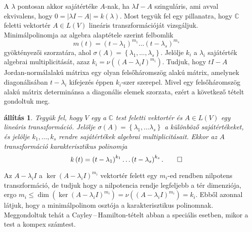 \documentclass[a4paper, showtrims]{memoir}
\makeatletter
\renewenvironment{proof}[1][\proofname]
    {\par\pushQED{\qed}%
    \normalfont \topsep6\p@\@plus6\p@\relax
    \trivlist
    \item[\hskip\labelsep
        \itshape
    #1\@addpunct{:}]\ignorespaces}
    {\popQED\endtrivlist\@endpefalse}
\theoremstyle{plain}
\newtheorem{proposition}{állítás}[chapter]
\theoremstyle{remark}
\theoremstyle{definition}
\makeatother
\begin{document}
\begin{proof}
	A $\lambda$ pontosan akkor sajátértéke $A$-nak,
	ha $\lambda I-A$ szinguláris,
	ami avval ekvivalens, hogy $0=|\lambda I-A|=k\left( \lambda \right)$.
\end{proof}
Most tegyük fel egy pillanatra, hogy $\mathbb{C}$ feletti vektortér $A\in L(V)$ lineáris transzformációját
vizsgáljuk. Minimálpolinomja az algebra alaptétele szerint felbomlik
\[
	m\left( t \right)
	=\left( t-\lambda_1 \right)^{m_1}\dots\left( t-\lambda_s \right)^{m_s}
\]
gyöktényezői szorzatára, ahol $\sigma\left( A \right)=\left\{ \lambda_1,\ldots,\lambda_s\right\}$.
Jelölje $k_i$ a $\lambda_i$ sajátérték algebrai multiplicitását,
azaz $k_i=\nu\left( \left( A-\lambda_i I \right)^{m_i} \right)$.
Tudjuk, hogy $tI-A$ Jordan-normálalakú
mátrixa egy olyan felsőháromszög alakú mátrix,
amelynek diagonálisában $t-\lambda_i$ kifejezés éppen $k_i$-szer szerepel.
Mivel egy felsőháromszög alakú mátrix determinánsa a diagonális elemek szorzata,
ezért a következő tételt gondoltuk meg.
\begin{proposition}
	Tegyük fel, hogy $V$ egy a $\mathbb{C}$ test feletti vektortér és $A\in L\left( V \right)$
	egy lineáris transzformáció.
	Jelölje $\sigma\left( A \right)=\left\{\lambda_1,\dots\lambda_s  \right\}$ a különböző sajátértékeket,
	és jelölje $k_1,\ldots,k_s$ rendre sajátértékek algebrai multiplicitásait.
	Ekkor az $A$ transzformáció karakterisztikus polinomja
	\[
		k\left( t \right)
		=
		\left( t-\lambda_1 \right)^{k_1}\dots\left( t-\lambda_s \right)^{k_s}.\qedhere
	\]
\end{proposition}
Az $A-\lambda_iI$ a $\ker\left( A-\lambda_iI \right)^{m_i}$ vektortér felett egy $m_i$-ed rendben nilpotens transzformáció,
de tudjuk hogy a nilpotencia rendje legfeljebb a tér dimenziója,
ergo
$m_i\leq\dim\left( \ker\left( A-\lambda_iI \right)^{m_i} \right)
	=
	\nu\left( \left( A-\lambda_iI \right)^{m_i} \right)=k_i$.
Ebből azonnal látjuk, hogy a minimálpolinom osztója a karakterisztikus polinomnak.
Meggondoltuk tehát a Cayley\,--\,Hamilton-tételt abban a speciális esetben,
mikor a test a kompex számtest.
\end{document}
